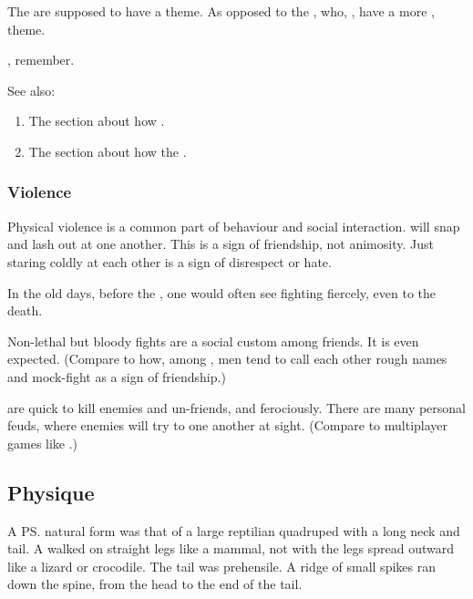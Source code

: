 The \dragons are supposed to have a  theme.
As opposed to the \resphain, who, , have a more ,  theme. 

, remember. 

See also: 
\begin{enumerate}
  \item 
    The section about how .
  \item 
    The section about how the \dragons {}. 
\end{enumerate}






\subsubsection{Violence}
Physical violence is a common part of \Draconic{} behaviour and social interaction. 
\Dragons{} will snap and lash out at one another. 
This is a sign of friendship, not animosity. 
Just staring coldly at each other is a sign of disrespect or hate. 

In the old days, before the \secondbanewar, one would often see \dragons{} fighting fiercely, even to the death. 

Non-lethal but bloody fights are a social custom among friends.
It is even expected. 
(Compare to how, among \humans, men tend to call each other rough names and mock-fight as a sign of friendship.)

\Dragons{} are quick to kill enemies and un-friends, and ferociously. 
There are many personal feuds, where enemies will try to  one another at sight. 
(Compare to multiplayer games like \cite{VideoGame:WorldofWarcraft}.)









\subsection{Physique}
A \ps{\dragon}{} natural form was that of a large reptilian quadruped with a long neck and tail. 
A \dragon{} walked on straight legs like a mammal, not with the legs spread outward like a lizard or crocodile. 
The tail was prehensile. 
A ridge of small spikes ran down the spine, from the head to the end of the tail. 

